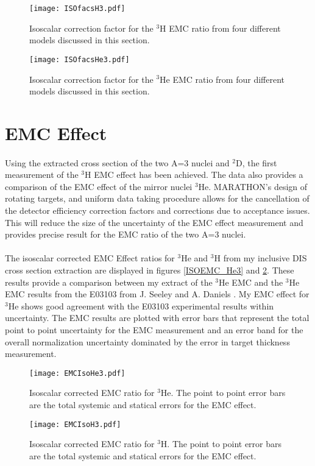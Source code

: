 	\begin{figure}[!]
		\texttt{[image: ISOfacsH3.pdf]}
		\caption{Isoscalar correction factor for the $^3$H EMC ratio from four different models discussed in this section.}
		\label{isofuncs}
		\vspace{1cm}
		\texttt{[image: ISOfacsHe3.pdf]}
		\caption{Isoscalar correction factor for the $^3$He EMC ratio from four different models discussed in this section.}
		\label{isofuncsHe3}
	\end{figure}

\section{EMC Effect}
\paragraph{} Using the extracted cross section of the two A=3 nuclei and $^2$D, the first measurement of the $^3$H EMC effect has been achieved. The data also provides a comparison of the EMC effect of the mirror nuclei $^3$He. MARATHON's design of rotating targets, and uniform data taking procedure allows for the cancellation of the detector efficiency correction factors and corrections due to acceptance issues. This will reduce the size of the uncertainty of the EMC effect measurement and provides precise result for the EMC ratio of the two A=3 nuclei. 
\paragraph{}The isoscalar corrected EMC Effect ratios for $^3$He and $^3$H from my inclusive DIS cross section extraction are displayed in figures \ref{ISOEMC_He3} and \ref{ISOEMC_H3}. These results provide a comparison between my extract of the $^3$He EMC and the $^3$He EMC results from the E03103 from J. Seeley and A. Daniels \cite{seeley}. My EMC effect for $^3$He shows good agreement with the E03103 experimental results within uncertainty. The EMC results are plotted with error bars that represent the total point to point uncertainty for the EMC measurement and an error band for the overall normalization uncertainty dominated by the error in target thickness measurement.  
	\begin{figure}[!]
		\texttt{[image: EMCIsoHe3.pdf]}
		\caption{Isoscalar corrected EMC ratio for $^3$He. The point to point error bars are the total systemic and statical errors for the EMC effect.}
		\label{ISOEMC_He3}
	\vspace{1cm}
	\texttt{[image: EMCIsoH3.pdf]}
	\caption{Isoscalar corrected EMC ratio for $^3$H. The point to point error bars are the total systemic and statical errors for the EMC effect.}
	\label{ISOEMC_H3}
\end{figure}

